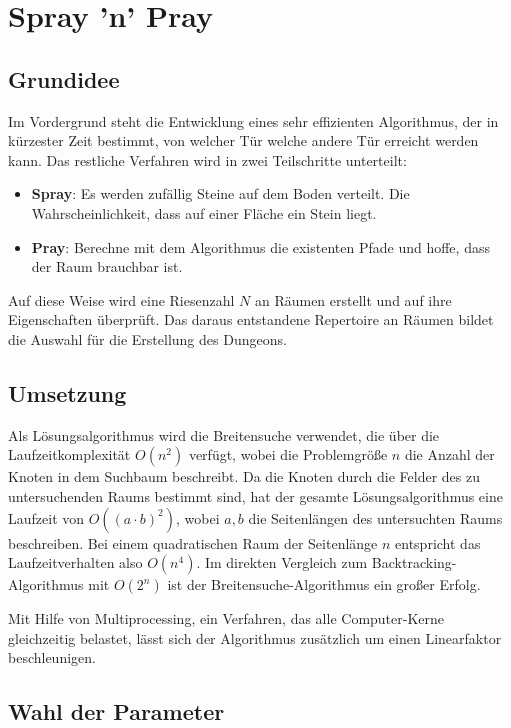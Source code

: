 \documentclass[a4paper,10pt,ngerman]{scrartcl}
\begin{document}
	\newpage
	\section{Spray 'n' Pray}
	
		\subsection{Grundidee}
		
			Im Vordergrund steht die Entwicklung eines sehr effizienten Algorithmus, der in kürzester Zeit bestimmt, von welcher Tür welche andere Tür erreicht werden kann. Das restliche Verfahren wird in zwei Teilschritte unterteilt:
			
			\begin{itemize}
				\item \textbf{Spray}: Es werden zufällig Steine auf dem Boden verteilt. Die Wahrscheinlichkeit, dass auf einer Fläche ein Stein liegt.
				\item \textbf{Pray}: Berechne mit dem Algorithmus die existenten Pfade und hoffe, dass der Raum brauchbar ist.
			\end{itemize}
	
			Auf diese Weise wird eine Riesenzahl \(N\) an Räumen erstellt und auf ihre Eigenschaften überprüft. Das daraus entstandene Repertoire an Räumen bildet die Auswahl für die Erstellung des Dungeons.


		\subsection{Umsetzung}

			Als Lösungsalgorithmus wird die Breitensuche verwendet, die über die Laufzeitkomplexität \(O(n^2)\) verfügt, wobei die Problemgröße \(n\) die Anzahl der Knoten in dem Suchbaum beschreibt. Da die Knoten durch die Felder des zu untersuchenden Raums bestimmt sind, hat der gesamte Lösungsalgorithmus eine Laufzeit von \( O( (a \cdot b)^2 ) \), wobei \(a,b\) die Seitenlängen des untersuchten Raums beschreiben. Bei einem quadratischen Raum der Seitenlänge \(n\) entspricht das Laufzeitverhalten also \( O(n^4) \). Im direkten Vergleich zum Backtracking-Algorithmus mit \( O(2^n) \) ist der Breitensuche-Algorithmus ein großer Erfolg.
			
			Mit Hilfe von Multiprocessing, ein Verfahren, das alle Computer-Kerne gleichzeitig belastet, lässt sich der Algorithmus zusätzlich um einen Linearfaktor beschleunigen.
			
		
		\subsection{Wahl der Parameter}
\end{document}
